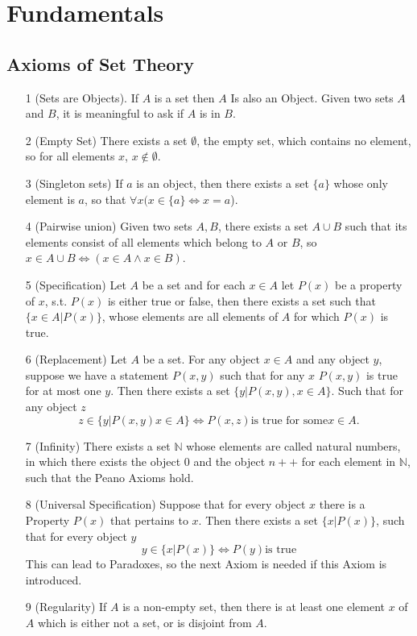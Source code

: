 \documentclass[]{scrbook}
\begin{document}
\section{Fundamentals}
\subsection{Axioms of Set Theory}
\begin{itemize}
	\item[1] (Sets are Objects). If $A$ is a set then $A$ Is also an Object. Given two sets $A$ and $B$, it is meaningful to ask if $A$ is in $B$.
	\item[2] (Empty Set) There exists a set $\emptyset$, the empty set, which contains no element, so for all elements $x$, $x\notin\emptyset$.
	\item[3] (Singleton sets) If $a$ is an object, then there exists a set $\{a\}$ whose only element is $a$, so that $\forall x(x \in \{a\} \Leftrightarrow x = a$).
	\item[4] (Pairwise union) Given two sets $A, B$, there exists a set $A\cup B$ such that its elements consist of all elements which belong to $A$ or $B$, so $x \in A\cup B \Leftrightarrow (x\in A\wedge x\in B)$.
	\item[5] (Specification) Let $A$ be a set and for each $x\in A$ let $P(x)$ be a property of $x$, s.t. $P(x)$ is either true or false, then there exists a set such that $\{x\in A | P(x)\}$, whose elements are all elements of $A$ for which $P(x)$ is true.
	\item[6] (Replacement) Let $A$ be a set. For any object $x\in A$ and any object $y$, suppose we have a statement $P(x,y)$ such that for any $x$ $P(x,y)$ is true for at most one $y$. Then there exists a set $\{y| P(x,y) , x\in A\}$. Such that for any object $z$
	\begin{equation*}
		z\in\{y | P(x,y) x\in A\} \Leftrightarrow P(x,z) \text{is true for some} x\in A.
	\end{equation*}
	\item[7] (Infinity) There exists a set $\mathbb{N}$ whose elements are called natural numbers, in which there exists the object $0$ and the object $n++$ for each element in $\mathbb{N}$, such that the Peano Axioms hold.
	\item[8] (Universal Specification) Suppose that for every object $x$ there is a Property $P(x)$ that pertains to $x$. Then there exists a set $\{x | P(x)\}$, such that for every object $y$
		\begin{equation}
			y\in\{x | P(x)\} \Leftrightarrow P(y) \text{is true}
		\end{equation}
	This can lead to Paradoxes, so the next Axiom is needed if this Axiom is introduced.
	\item[9] (Regularity) If $A$ is a non-empty set, then there is at least one element $x$ of $A$ which is either not a set, or is disjoint from $A$.
\end{itemize}
\end{document}

